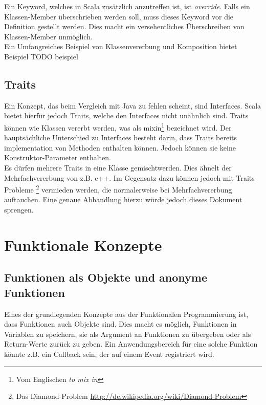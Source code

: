 Ein Keyword, welches in Scala zusätzlich anzutreffen ist, ist 
\emph{override}. Falls ein Klassen-Member überschrieben werden soll,
muss dieses Keyword vor die Definition gestellt werden. Dies macht
ein versehentliches Überschreiben von Klassen-Member unmöglich.\\

Ein Umfangreiches Beispiel von Klassenvererbung und Komposition bietet
Beispiel TODO beispiel

\subsection{Traits}

Ein Konzept, das beim Vergleich mit Java zu fehlen scheint, sind 
Interfaces. Scala bietet hierfür jedoch Traits, welche
den Interfaces nicht unähnlich sind. Traits können wie Klassen
vererbt werden, was als \glqq mixin\grqq \footnote{Vom Englischen \emph{to mix in}}
bezeichnet wird. Der hauptsächliche Unterschied zu Interfaces besteht 
darin, dass Traits bereits implementation von Methoden enthalten
können. Jedoch können sie keine Konstruktor-Parameter enthalten. \\

Es dürfen mehrere Traits in eine Klasse \glqq gemischt\grqq werden. Dies
ähnelt der Mehrfachvererbung von z.B. c++. Im Gegensatz dazu können
jedoch mit Traits Probleme
\footnote{Das Diamond-Problem 
\href{http://de.wikipedia.org/wiki/Diamond-Problem}
{http://de.wikipedia.org/wiki/Diamond-Problem}} vermieden werden, die 
normalerweise bei Mehrfachvererbung auftauchen. Eine genaue Abhandlung
hierzu würde jedoch dieses Dokument sprengen.

\section{Funktionale Konzepte}

\subsection{Funktionen als Objekte und anonyme Funktionen}
\label{sec:functionsObjects}

Eines der grundlegenden Konzepte aus der Funktionalen Programmierung ist,
dass Funktionen auch Objekte sind. Dies macht es möglich, Funktionen
in Variablen zu speichern, sie als Argument an Funktionen zu übergeben
oder als Return-Werte zurück zu geben. Ein Anwendungsbereich für eine
solche Funktion könnte z.B. ein Callback sein, der auf einem Event
registriert wird.\\

